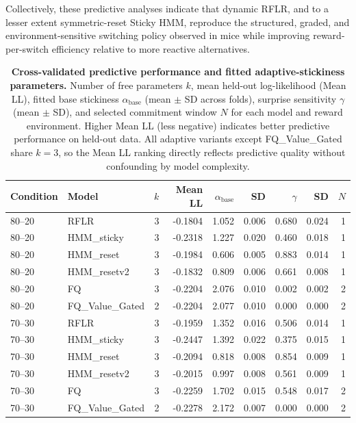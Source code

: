 \documentclass[11pt, reprint, aps, prl]{revtex4-2}
\begin{document}
Collectively, these predictive analyses indicate that dynamic RFLR, and to a lesser extent symmetric-reset Sticky HMM, reproduce the structured, graded, and environment-sensitive switching policy observed in mice while improving reward-per-switch efficiency relative to more reactive alternatives.

\begin{table}[t]
\centering
\caption{\textbf{Cross-validated predictive performance and fitted adaptive-stickiness parameters.}
Number of free parameters $k$, mean held-out log-likelihood (Mean LL), fitted base stickiness $\alpha_{\text{base}}$ (mean $\pm$ SD across folds),
surprise sensitivity $\gamma$ (mean $\pm$ SD), and selected commitment window $N$ for each model and reward environment.
Higher Mean LL (less negative) indicates better predictive performance on held-out data.
All adaptive variants except FQ\_Value\_Gated share $k=3$, so the Mean LL ranking directly reflects predictive quality without confounding by model complexity.}
\label{tab:phase4_model_comparison}
\begin{tabular}{llrrrrrrr}
\toprule
Condition & Model & $k$ & Mean LL & $\alpha_{\text{base}}$ & SD & $\gamma$ & SD & $N$ \\
\midrule
80--20 & RFLR & 3 & -0.1804 & 1.052 & 0.006 & 0.680 & 0.024 & 1 \\
80--20 & HMM\_sticky & 3 & -0.2318 & 1.227 & 0.020 & 0.460 & 0.018 & 1 \\
80--20 & HMM\_reset & 3 & -0.1984 & 0.606 & 0.005 & 0.883 & 0.014 & 1 \\
80--20 & HMM\_resetv2 & 3 & -0.1832 & 0.809 & 0.006 & 0.661 & 0.008 & 1 \\
80--20 & FQ & 3 & -0.2204 & 2.076 & 0.010 & 0.002 & 0.002 & 2 \\
80--20 & FQ\_Value\_Gated & 2 & -0.2204 & 2.077 & 0.010 & 0.000 & 0.000 & 2 \\
70--30 & RFLR & 3 & -0.1959 & 1.352 & 0.016 & 0.506 & 0.014 & 1 \\
70--30 & HMM\_sticky & 3 & -0.2447 & 1.392 & 0.022 & 0.375 & 0.015 & 1 \\
70--30 & HMM\_reset & 3 & -0.2094 & 0.818 & 0.008 & 0.854 & 0.009 & 1 \\
70--30 & HMM\_resetv2 & 3 & -0.2015 & 0.997 & 0.008 & 0.561 & 0.009 & 1 \\
70--30 & FQ & 3 & -0.2259 & 1.702 & 0.015 & 0.548 & 0.017 & 2 \\
70--30 & FQ\_Value\_Gated & 2 & -0.2278 & 2.172 & 0.007 & 0.000 & 0.000 & 2 \\
\bottomrule
\end{tabular}
\end{table}
\end{document}
